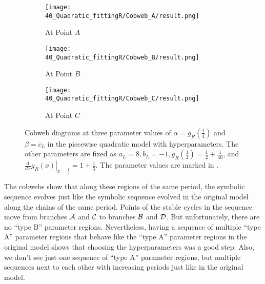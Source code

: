 \begin{figure}
	\centering
	\begin{subfigure}{0.3\textwidth}
		\centering
		\texttt{[image: 40\_Quadratic\_fittingR/Cobweb\_A/result.png]}
		\caption{At Point $A$}
		\label{fig:setup.quad.hyper.1.cobweb.A}
	\end{subfigure}
	\begin{subfigure}{0.3\textwidth}
		\centering
		\texttt{[image: 40\_Quadratic\_fittingR/Cobweb\_B/result.png]}
		\caption{At Point $B$}
		\label{fig:setup.quad.hyper.1.cobweb.B}
	\end{subfigure}
	\begin{subfigure}{0.3\textwidth}
		\centering
		\texttt{[image: 40\_Quadratic\_fittingR/Cobweb\_C/result.png]}
		\caption{At Point $C$}
		\label{fig:setup.quad.hyper.1.cobweb.C}
	\end{subfigure}
	\caption[Cobwebs of the first piecewise quadratic model with hyperparameters]{
	Cobweb diagrams at three parameter values of $\alpha = g_R\left(\frac{1}{4}\right)$ and $\beta = c_L$ in the piecewise quadratic model with hyperparameters.
	The other parameters are fixed as $a_L = 8, b_L = -1, g_R\left(\frac{1}{2}\right) = \frac{1}{2} + \frac{1}{40}$, and $\left. \frac{d}{dx} g_R(x) \right|_{x = \frac{1}{2}} = 1 + \frac{1}{5}$.
	The parameter values are marked in .
	}
	\label{fig:setup.quad.hyper.1.cobwebs}
\end{figure}


The cobwebs show that along these regions of the same period, the symbolic sequence evolves just like the symbolic sequence evolved in the original model along the chains of the same period.
Points of the stable cycles in the sequence move from branches $\mathcal{A}$ and $\mathcal{C}$ to branches $\mathcal{B}$ and $\mathcal{D}$.
But unfortunately, there are no ``type B'' parameter regions.
Nevertheless, having a sequence of multiple ``type A'' parameter regions that behave like the ``type A'' parameter regions in the original model shows that choosing the hyperparameters was a good step.
Also, we don't see just one sequence of ``type A'' parameter regions, but multiple sequences next to each other with increasing periods just like in the original model.
